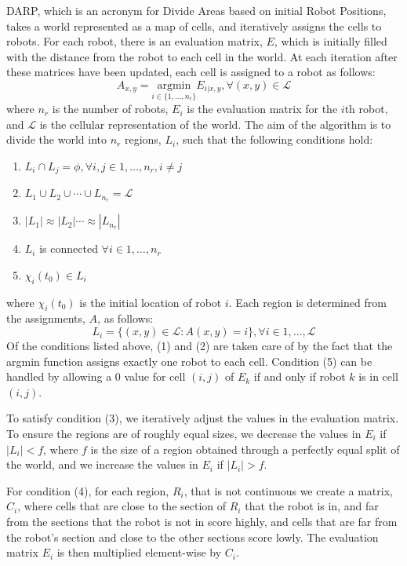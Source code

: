 \documentclass[a4paper, 10pt, conference]{ieeeconf}      %
\begin{document}
DARP, which is an acronym for Divide Areas based on initial Robot Positions, takes a world represented as a map of cells, and iteratively assigns the cells to robots. For each robot, there is an evaluation matrix, $E$, which is initially filled with the distance from the robot to each cell in the world. At each iteration after these matrices have been updated, each cell is assigned to a robot as follows:
\begin{equation*}
	A_{x, y} = \underset{i \in {\{1,\hdots,n_r\}}}{\mathrm{argmin}} E_{i|x,y}, \forall(x, y) \in \mathcal{L}
\end{equation*}
where $n_r$ is the number of robots, $E_i$ is the evaluation matrix for the $i$th robot, and $\mathcal{L}$ is the cellular representation of the world. The aim of the algorithm is to divide the world into $n_r$ regions, $L_i$, such that the following conditions hold:
\begin{enumerate}
	\item $L_i \cap L_j = \phi , \forall i, j \in 1, \hdots, n_r, i \neq j$
	\item $L_1\cup L_2 \cup \cdots \cup L_{n_r} = \mathcal{L}$
	\item $|L_1| \approx |L_2| \cdots \approx |L_{n_r}|$
	\item $L_i$ is connected $\forall i \in 1, \hdots, n_r$
	\item $\chi_i(t_0) \in L_i$
\end{enumerate}
where $\chi_i(t_0)$ is the initial location of robot $i$. Each region is determined from the assignments, $A$, as follows:
\begin{equation*}
L_i = \{(x, y) \in \mathcal{L} : A(x, y)=i\}, \forall i \in 1, \hdots, \mathcal{L}
\end{equation*}
Of the conditions listed above, (1) and (2) are taken care of by the fact that the argmin function assigns exactly one robot to each cell. Condition (5) can be handled by allowing a 0 value for cell $(i, j)$ of $E_k$ if and only if robot $k$ is in cell $(i, j)$.

To satisfy condition (3), we iteratively adjust the values in the evaluation matrix. To ensure the regions are of roughly equal sizes, we decrease the values in $E_i$ if $|L_i| < f$, where $f$ is the size of a region obtained through a perfectly equal split of the world, and we increase the values in $E_i$ if $|L_i| > f$.

For condition (4), for each region, $R_i$, that is not continuous we create a matrix, $C_i$, where cells that are close to the section of $R_i$ that the robot is in, and far from the sections that the robot is not in score highly, and cells that are far from the robot's section and close to the other sections score lowly. The evaluation matrix $E_i$ is then multiplied element-wise by $C_i$.
\end{document}
